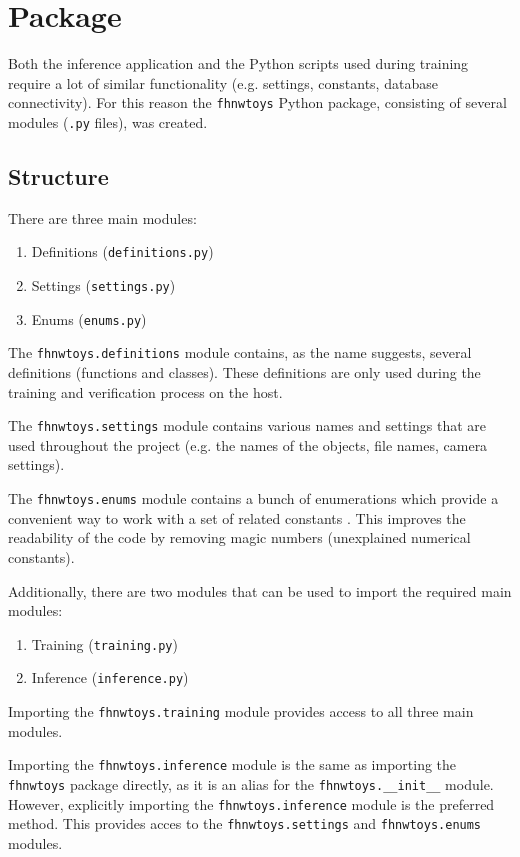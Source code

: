 \section{Package}
\label{sec:inference:package}

Both the inference application and the Python scripts used during training require a lot of similar functionality (e.g. settings, constants, database connectivity).
For this reason the \texttt{fhnwtoys} Python package, consisting of several modules (\texttt{.py} files), was created.

\subsection{Structure}
\label{subsec:inference:package:structure}
There are three main modules:
\begin{enumerate}
  \item Definitions (\texttt{definitions.py})
  \item Settings (\texttt{settings.py})
  \item Enums (\texttt{enums.py})
\end{enumerate}

The \texttt{fhnwtoys.definitions} module contains, as the name suggests, several definitions (functions and classes).
These definitions are only used during the training and verification process on the host.

The \texttt{fhnwtoys.settings} module contains various names and settings that are used throughout the project (e.g. the names of the objects, file names, camera settings).

The \texttt{fhnwtoys.enums} module contains a bunch of enumerations which provide a convenient way to work with a set of related constants \cite{inf_enum}.
This improves the readability of the code by removing magic numbers (unexplained numerical constants).

Additionally, there are two modules that can be used to import the required main modules:
\begin{enumerate}
  \item Training (\texttt{training.py})
  \item Inference (\texttt{inference.py})
\end{enumerate}

Importing the \texttt{fhnwtoys.training} module provides access to all three main modules.

Importing the \texttt{fhnwtoys.inference} module is the same as importing the \texttt{fhnwtoys} package directly, as it is an alias for the \texttt{fhnwtoys.\_\_init\_\_} module.
However, explicitly importing the \texttt{fhnwtoys.inference} module is the preferred method.
This provides acces to the \texttt{fhnwtoys.settings} and \texttt{fhnwtoys.enums} modules.

